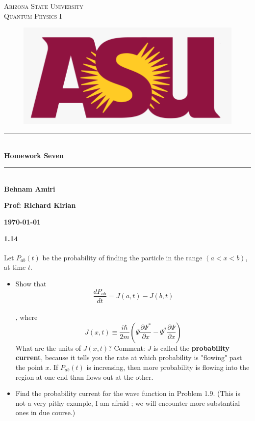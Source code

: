 \documentclass[fleqn]{article}
\begin{document}
  \begin{titlepage}

    \newcommand{\HRule}{\rule{\linewidth}{0.5mm}}

    \center


    \textsc{\LARGE Arizona State University}\\[1.5cm]

    \textsc{\LARGE Quantum Physics I }\\[1.5cm]


    \begin{figure}
      \includegraphics[width=\linewidth]{asu.png}
    \end{figure}


    \HRule \\[0.4cm]
    { \huge \bfseries Homework Seven}\\[0.4cm] 
    \HRule \\[1.5cm]

    \textbf{Behnam Amiri}

    \bigbreak

    \textbf{Prof: Richard Kirian}

    \bigbreak


    \textbf{{\large \today}\\[2cm]}

    \vfill 

  \end{titlepage}

  \textbf{1.14} \\ \\
  Let $P_{ab}(t)$ be the probability of finding the particle in the range $(a<x<b)$, at time $t$.
  \begin{itemize}
    \item Show that $$\dfrac{dP_{ab}}{dt}=J(a,t)-J(b,t)$$ \\
    , where \\
    $$J(x,t)\equiv \dfrac{i \hbar}{2m} \left(\Psi \dfrac{\partial \Psi^*}{\partial x}-\Psi^* \dfrac{\partial \Psi}{\partial x}\right)$$
    What are the units of $J(x,t)?$ Comment: $J$ is called the \textbf{probability current}, because it tells you the rate at which 
    probability is "flowing" past the point $x$. If $P_{ab}(t)$ is increasing, then more probability is flowing into the region
    at one end than flows out at the other.
    
    \item Find the probability current for the wave function in Problem 1.9. (This is not a very pithy example, I am afraid
    ; we will encounter more substantial ones in due course.)
  \end{itemize}
\end{document}
